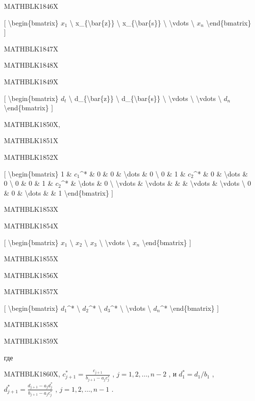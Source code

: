 \documentclass[
]{article}
\begin{document}
{{{MATHBLK1846X

{[} \textbackslash begin\{bmatrix\} \(x_1\) \textbackslash{}
x\_\{\textbackslash bar\{z\}\} \textbackslash{}
x\_\{\textbackslash bar\{s\}\} \textbackslash{} \textbackslash vdots
\textbackslash{} \(x_n\) \textbackslash end\{bmatrix\} {]}

MATHBLK1847X

MATHBLK1848X

MATHBLK1849X

{[} \textbackslash begin\{bmatrix\} \(d_t\) \textbackslash{}
d\_\{\textbackslash bar\{z\}\} \textbackslash{}
d\_\{\textbackslash bar\{s\}\} \textbackslash{} \textbackslash vdots
\textbackslash{} \textbackslash vdots \textbackslash{} \(d_n\)
\textbackslash end\{bmatrix\} {]}

MATHBLK1850X,

MATHBLK1851X

MATHBLK1852X

{[} \textbackslash begin\{bmatrix\} 1 \& \(c_1\)\^{}* \& 0 \& 0 \&
\textbackslash dots \& 0 \textbackslash{} 0 \& 1 \& \(c_2\)\^{}* \& 0 \&
\textbackslash dots \& 0 \textbackslash{} 0 \& 0 \& 1 \& \(c_2\)\^{}* \&
\textbackslash dots \& 0 \textbackslash{} \textbackslash vdots \&
\textbackslash vdots \& \& \& \textbackslash vdots \&
\textbackslash vdots \textbackslash{} 0 \& 0 \& \textbackslash dots \&
\& 1 \textbackslash end\{bmatrix\} {]}

MATHBLK1853X

MATHBLK1854X

{[} \textbackslash begin\{bmatrix\} \(x_1\) \textbackslash{} \(x_2\)
\textbackslash{} \(x_3\) \textbackslash{} \textbackslash vdots
\textbackslash{} \(x_n\) \textbackslash end\{bmatrix\} {]}

MATHBLK1855X

MATHBLK1856X

MATHBLK1857X

{[} \textbackslash begin\{bmatrix\} \(d_1\)\^{}* \textbackslash{}
\(d_2\)\^{}* \textbackslash{} \(d_3\)\^{}* \textbackslash{}
\textbackslash vdots \textbackslash{} \(d_n\)\^{}*
\textbackslash end\{bmatrix\} {]}

MATHBLK1858X

MATHBLK1859X

где

MATHBLK1860X, \(c_{j+1}^* = \frac{c_{j+1}}{b_{j+1} - a_j c_j^*}\) ,
\(j = 1, 2, \ldots, n-2\) , и \(d_1^* = d_1/b_1\) ,
\(d_{j+1}^* = \frac{d_{j+1} - a_j d_j^*}{b_{j+1} - a_j c_j^*}\) ,
\(j = 1, 2, \ldots, n-1\) .

}}}
\end{document}
